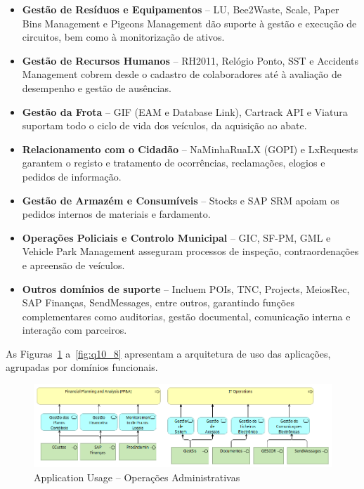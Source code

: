 \documentclass[12pt,a4paper,final]{article}
\begin{document}
    \begin{itemize}
        \item \textbf{Gestão de Resíduos e Equipamentos} – LU, Bee2Waste, Scale, Paper Bins Management e Pigeons Management dão suporte à gestão e execução de circuitos, bem como à monitorização de ativos.
        \item \textbf{Gestão de Recursos Humanos} – RH2011, Relógio Ponto, SST e Accidents Management cobrem desde o cadastro de colaboradores até à avaliação de desempenho e gestão de ausências.
        \item \textbf{Gestão da Frota} – GIF (EAM e Database Link), Cartrack API e Viatura suportam todo o ciclo de vida dos veículos, da aquisição ao abate.
        \item \textbf{Relacionamento com o Cidadão} – NaMinhaRuaLX (GOPI) e LxRequests garantem o registo e tratamento de ocorrências, reclamações, elogios e pedidos de informação.
        \item \textbf{Gestão de Armazém e Consumíveis} – Stocks e SAP SRM apoiam os pedidos internos de materiais e fardamento.
        \item \textbf{Operações Policiais e Controlo Municipal} – GIC, SF-PM, GML e Vehicle Park Management asseguram processos de inspeção, contraordenações e apreensão de veículos.
        \item \textbf{Outros domínios de suporte} – Incluem POIs, TNC, Projects, MeiosRec, SAP Finanças, SendMessages, entre outros, garantindo funções complementares como auditorias, gestão documental, comunicação interna e interação com parceiros.
    \end{itemize}

    As Figuras~\ref{fig:q10_1} a~\ref{fig:q10_8} apresentam a arquitetura de uso das aplicações, agrupadas por domínios funcionais.

    \vspace{0.5cm}

    \begin{figure}[H]
        \centering
        \includegraphics[width=\textwidth]{Q10_1}
        \caption{Application Usage – Operações Administrativas}
        \label{fig:q10_1}
    \end{figure}
\end{document}
